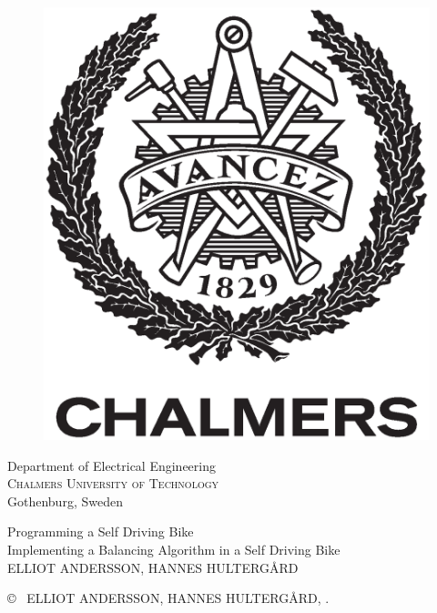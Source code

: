 \begin{center}
\begin{figure}[H]
    \includegraphics[width=0.2\pdfpagewidth]{figure/auxiliary/AvancezChalmers_black_centered.eps} \\
    \fi
	\end{figure}	\vspace{5mm}	
	
    Department of Electrical Engineering \\
	\textsc{Chalmers University of Technology} \\
	Gothenburg, Sweden \the\year \\
\end{center}


\newpage
\thispagestyle{plain}
\vspace*{4.5cm}
Programming a Self Driving Bike\\
Implementing a Balancing Algorithm in a Self Driving Bike\\
ELLIOT ANDERSSON, HANNES HULTERGÅRD \setlength{\parskip}{1cm}

\copyright ~ ELLIOT ANDERSSON, HANNES HULTERGÅRD, \the\year. \setlength{\parskip}{1cm}

